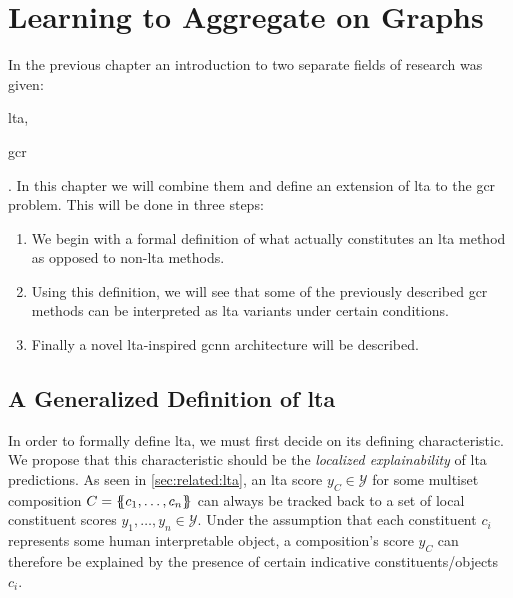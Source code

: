 \chapter{Learning to Aggregate on Graphs}%
\label{sec:ltag}

In the previous chapter an introduction to two separate fields of research was given:
\begin{enumerate*}
	\item \Acf{lta},
	\item \Acf{gcr}
\end{enumerate*}.
In this chapter we will combine them and define an extension of \ac{lta} to the \ac{gcr} problem.
This will be done in three steps:
\begin{enumerate}
	\item We begin with a formal definition of what actually constitutes an \ac{lta} method as opposed to non-\acs{lta} methods.
	\item Using this definition, we will see that some of the previously described \ac{gcr} methods can be interpreted as \ac{lta} variants under certain conditions.
	\item Finally a novel \acs{lta}-inspired \ac{gcnn} architecture will be described.
\end{enumerate}

\section{A Generalized Definition of \acs*{lta}}%
\label{sec:ltag:definition}

In order to formally define \ac{lta}, we must first decide on its defining characteristic.
We propose that this characteristic should be the \textit{localized explainability} of \ac{lta} predictions.
As seen in \cref{sec:related:lta}, an \ac{lta} score $y_{C} \in \mathcal{Y}$ for some multiset composition $C = \ldblbrace c_1, \dots, c_n \rdblbrace$ can always be tracked back to a set of local constituent scores $y_1, \dots, y_n \in \mathcal{Y}$.
Under the assumption that each constituent $c_i$ represents some human interpretable object, a composition's score $y_{C}$ can therefore be explained by the presence of certain indicative constituents/objects $c_i$.

